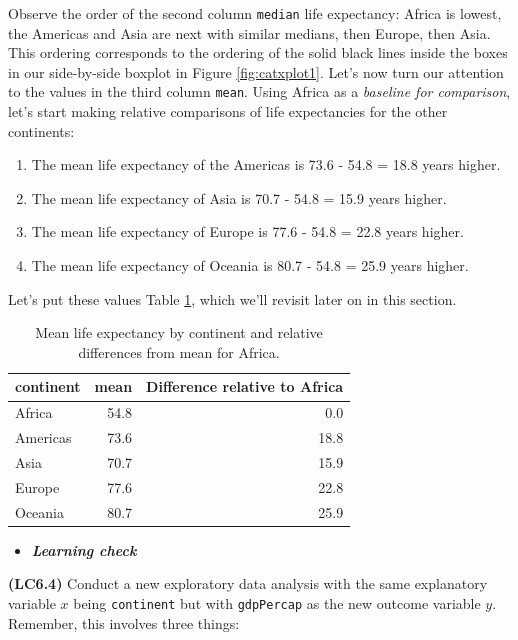 \documentclass[12pt, krantz2,]{krantz}
\providecommand{\tightlist}{%
  \setlength{\itemsep}{0pt}\setlength{\parskip}{0pt}}
\newenvironment{rmdblock}[1]
  {\begin{shaded*}
  \begin{itemize}
  \renewcommand{\labelitemi}{
    \raisebox{-.7\height}[0pt][0pt]{
    }
  }
  \item
  }
  {
  \end{itemize}
  \end{shaded*}
  }
\newenvironment{learncheck}
  {\begin{rmdblock}{warning}}
  {\end{rmdblock}}
\begin{document}
Observe the order of the second column \texttt{median} life expectancy: Africa is lowest, the Americas and Asia are next with similar medians, then Europe, then Asia. This ordering corresponds to the ordering of the solid black lines inside the boxes in our side-by-side boxplot in Figure \ref{fig:catxplot1}. Let's now turn our attention to the values in the third column \texttt{mean}. Using Africa as a \emph{baseline for comparison}, let's start making relative comparisons of life expectancies for the other continents:

\begin{enumerate}
\def\labelenumi{\arabic{enumi}.}
\tightlist
\item
  The mean life expectancy of the Americas is 73.6 - 54.8 = 18.8 years higher.
\item
  The mean life expectancy of Asia is 70.7 - 54.8 = 15.9 years higher.
\item
  The mean life expectancy of Europe is 77.6 - 54.8 = 22.8 years higher.
\item
  The mean life expectancy of Oceania is 80.7 - 54.8 = 25.9 years higher.
\end{enumerate}

Let's put these values Table \ref{tab:continent-mean-life-expectancies}, which we'll revisit later on in this section.

\begin{table}[H]

\caption{\label{tab:continent-mean-life-expectancies}Mean life expectancy by continent and relative differences from mean for Africa.}
\centering
\fontsize{10}{12}\selectfont
\begin{tabular}{lrr}
\toprule
continent & mean & Difference relative to Africa\\
\midrule
Africa & 54.8 & 0.0\\
Americas & 73.6 & 18.8\\
Asia & 70.7 & 15.9\\
Europe & 77.6 & 22.8\\
Oceania & 80.7 & 25.9\\
\bottomrule
\end{tabular}
\end{table}

\begin{learncheck}
\textbf{\emph{Learning check}}
\end{learncheck}

\textbf{(LC6.4)} Conduct a new exploratory data analysis with the same explanatory variable \(x\) being \texttt{continent} but with \texttt{gdpPercap} as the new outcome variable \(y\). Remember, this involves three things:
\end{document}
